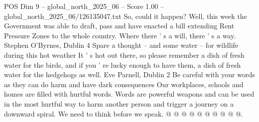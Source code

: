\begin{textsample}{POS Dim 9 – global\_north\_2025\_06 – Score 1.00 – global\_north\_2025\_06/126135047.txt}
So, could it happen?
Well, this week the Government was able to draft, pass and have enacted a bill extending Rent Pressure Zones to the whole country.
Where there ' s a will, there ' s a way.
Stephen O'Byrnes, Dublin 4 Spare a thought -- and some water -- for wildlife during this hot weather It ' s hot out there, so please remember a dish of fresh water for the birds, and if you ' re lucky enough to have them, a dish of fresh water for the hedgehogs as well.
Eve Parnell, Dublin 2 Be careful with your words as they can do harm and have dark consequences Our workplaces, schools and homes are filled with hurtful words.
Words are powerful weapons and can be used in the most hurtful way to harm another person and trigger a journey on a downward spiral.
We need to think before we speak. @ @ @ @ @ @ @ @ @ @.

\end{textsample}
